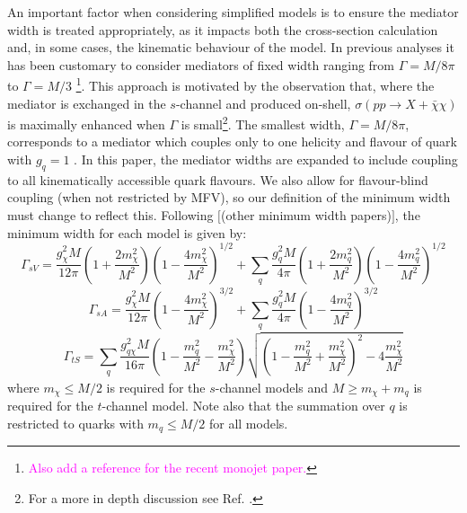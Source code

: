 \begin{flushleft}
An important factor when considering simplified models is to ensure the mediator width is treated appropriately, as it impacts both the cross-section calculation and, in some cases, the kinematic behaviour of the model. In previous analyses it has been customary to consider mediators of fixed width ranging from $\Gamma = M/8\pi$ to $\Gamma = M/3$ \cite{METSig, Fox:2012ee} \footnote{\textcolor{magenta}{Also add a reference for the recent monojet paper.}}. This approach is motivated by the observation that, where the mediator is exchanged in the $s$-channel and produced on-shell, $\sigma\left(pp \rightarrow X + \bar{\chi}\chi\right)$ is maximally enhanced when $\Gamma$ is small\footnote{For a more in depth discussion see Ref. \cite{METSig}.}. The smallest width, $\Gamma = M/8\pi$, corresponds to a mediator which couples only to one helicity and flavour of quark with $g_{q} = 1$ \cite{METSig}. In this paper, the mediator widths are expanded to include coupling to all kinematically accessible quark flavours. We also allow for flavour-blind coupling (when not restricted by MFV), so our definition of the minimum width must change to reflect this. Following $[$(other minimum width papers)$]$, the minimum width for each model is given by:
\begin{equation}
\label{gamma_sV}
\Gamma_{sV} = \frac{g_{\chi}^2 M}{12\pi}\left(1 + \frac{2m_{\chi}^{2}}{M^{2}}\right)\left(1 - \frac{4m_{\chi}^{2}}{M^{2}}\right)^{1/2} + \sum_{\substack{q}}\frac{g_q^2M}{4\pi}\left(1 + \frac{2m_{q}^{2}}{M^{2}}\right)\left(1 - \frac{4m_{q}^{2}}{M^{2}}\right)^{1/2}
\end{equation}
\begin{equation}
\label{gamma_sA}
\Gamma_{sA} = \frac{g_{\chi}^2 M}{12\pi}\left(1 - \frac{4m_{\chi}^{2}}{M^{2}}\right)^{3/2} + \sum_{\substack{q}}\frac{g_q^2 M}{4\pi}\left(1 - \frac{4m_{q}^{2}}{M^{2}}\right)^{3/2}
\end{equation}
\begin{equation}
\label{gamma_tS}
\Gamma_{tS} = \sum_{\substack{q}} \frac{g_{q\chi}^2M}{16\pi}\left(1 - \frac{m_{q}^{2}}{M^{2}} - \frac{m_{\chi}^{2}}{M^{2}}\right)\sqrt{\left(1 - \frac{m_{q}^{2}}{M^{2}} + \frac{m_{\chi}^{2}}{M^{2}}\right)^{2} - 4\frac{m_{\chi}^{2}}{M^{2}}}
\end{equation}
where $m_{\chi} \leq M/2$ is required for the $s$-channel models and $M \geq m_{\chi} + m_{q}$ is required for the $t$-channel model. Note also that the summation over $q$ is restricted to quarks with $m_{q} \leq M/2$ for all models. 


\end{flushleft}
